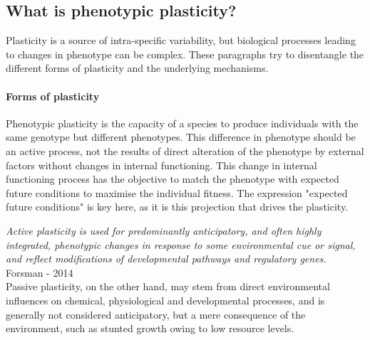 \subsection{What is phenotypic plasticity?}

Plasticity is a source of intra-specific variability, but biological processes leading to changes in phenotype can be complex. These paragraphs try to disentangle the different forms of plasticity and the underlying mechanisms.

\paragraph{Forms of plasticity}
Phenotypic plasticity is the capacity of a species to produce individuals with the same genotype but different phenotypes. This difference in phenotype should be an active process, not the results of direct alteration of the phenotype by external factors without changes in internal functioning. This change in internal functioning process has the objective  to match the phenotype with expected future conditions to maximise the individual fitness. The expression "expected future conditions" is key here, as it is this projection that drives the plasticity.

\textit{Active plasticity is used for predominantly anticipatory, and often highly integrated, phenotypic changes in response to some environmental cue or signal, and reflect modifications of developmental pathways and regulatory genes.} Forsman - 2014\\


Passive plasticity, on the other hand, may stem from direct environmental influences on chemical, physiological and developmental processes, and is generally not considered anticipatory, but a mere consequence of the environment, such as stunted growth owing to low resource levels.\\


